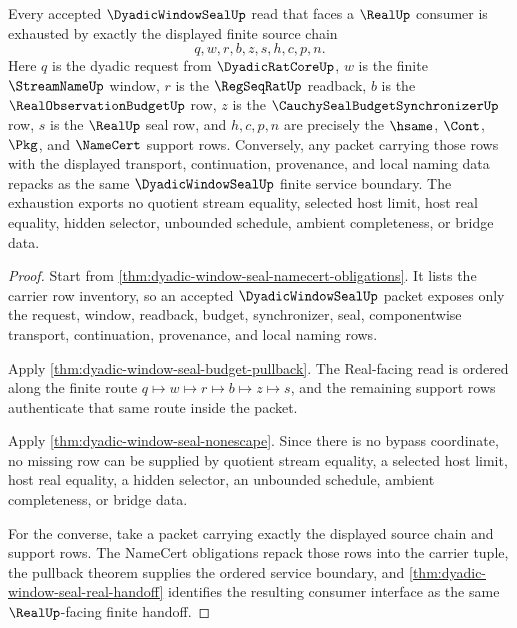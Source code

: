 \begin{theorem}
\label{thm:dyadic-window-seal-finite-source-exhaustion}
Every accepted $\DyadicWindowSealUp$ read that faces a $\RealUp$ consumer is exhausted by exactly the displayed finite source chain
$$
q,w,r,b,z,s,h,c,p,n.
$$
Here $q$ is the dyadic request from $\DyadicRatCoreUp$, $w$ is the finite $\StreamNameUp$ window, $r$ is the $\RegSeqRatUp$ readback, $b$ is the $\RealObservationBudgetUp$ row, $z$ is the $\CauchySealBudgetSynchronizerUp$ row, $s$ is the $\RealUp$ seal row, and $h,c,p,n$ are precisely the $\hsame$, $\Cont$, $\Pkg$, and $\NameCert$ support rows. Conversely, any packet carrying those rows with the displayed transport, continuation, provenance, and local naming data repacks as the same $\DyadicWindowSealUp$ finite service boundary. The exhaustion exports no quotient stream equality, selected host limit, host real equality, hidden selector, unbounded schedule, ambient completeness, or bridge data.
\end{theorem}
\begin{proof}
Start from \autoref{thm:dyadic-window-seal-namecert-obligations}. It lists the carrier row inventory, so an accepted $\DyadicWindowSealUp$ packet exposes only the request, window, readback, budget, synchronizer, seal, componentwise transport, continuation, provenance, and local naming rows.

Apply \autoref{thm:dyadic-window-seal-budget-pullback}. The Real-facing read is ordered along the finite route $q\longmapsto w\longmapsto r\longmapsto b\longmapsto z\longmapsto s$, and the remaining support rows authenticate that same route inside the packet.

Apply \autoref{thm:dyadic-window-seal-nonescape}. Since there is no bypass coordinate, no missing row can be supplied by quotient stream equality, a selected host limit, host real equality, a hidden selector, an unbounded schedule, ambient completeness, or bridge data.

For the converse, take a packet carrying exactly the displayed source chain and support rows. The NameCert obligations repack those rows into the carrier tuple, the pullback theorem supplies the ordered service boundary, and \autoref{thm:dyadic-window-seal-real-handoff} identifies the resulting consumer interface as the same $\RealUp$-facing finite handoff.
\end{proof}


